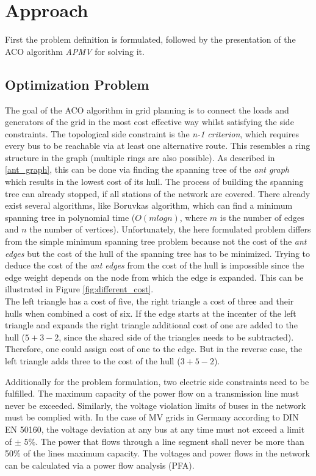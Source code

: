 \chapter{Approach}\label{chap:approach}
First the problem definition is formulated, followed by the presentation of the ACO algorithm \textit{APMV} for solving it.

\section{Optimization Problem}\label{optiproblem}
The goal of the ACO algorithm in grid planning is to connect the loads and generators of the grid in the most cost effective way whilst satisfying the side constraints. The topological side constraint is the \textit{n-1 criterion}, which requires every bus to be reachable via at least one alternative route. This resembles a ring structure in the graph (multiple rings are also possible). As described in \ref{ant_graph}, this can be done via finding the spanning tree of the \textit{ant graph} which results in the lowest cost of its hull. The process of building the spanning tree can already stopped, if all stations of the network are covered. There already exist several algorithms, like Boruvkas algorithm, which can find a minimum spanning tree in polynomial time ($O(mlogn)$, where $m$ is the number of edges and $n$ the number of vertices). Unfortunately, the here formulated problem differs from the simple minimum spanning tree problem because not the cost of the \textit{ant edges} but the cost of the hull of the spanning tree has to be minimized. Trying to deduce the cost of the \textit{ant edges} from the cost of the hull is impossible since the edge weight depends on the node from which the edge is expanded. This can be illustrated in Figure \ref{fig:different_cost}.
 \\
The left triangle has a cost of five, the right triangle a cost of three and their hulls when combined a cost of six. If the edge starts at the incenter of the left triangle and expands the right triangle additional cost of one are added to the hull ($5+3-2$, since the shared side of the triangles needs to be subtracted). Therefore, one could assign cost of one to the edge. But in the reverse case, the left triangle adds three to the cost of the hull ($3+5-2$).

Additionally for the problem formulation, two electric side constraints need to be fulfilled. The maximum capacity of the power flow on a transmission line must never be exceeded. Similarly, the voltage violation limits of buses in the network must be complied with. In the case of MV grids in Germany according to DIN EN 50160, the voltage deviation at any bus at any time must not exceed a limit of  $\pm$ 5\%. The power that flows through a line segment shall never be more than 50\% of the lines maximum capacity. The voltages and power flows in the network can be calculated via a power flow analysis (PFA).


